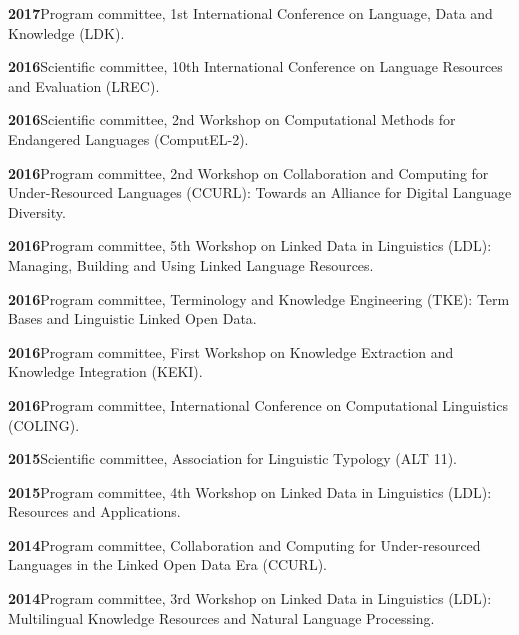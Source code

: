 \documentclass[11pt]{article}
\newcommand{\hangpara}{
 \setlength{\parindent}{0in} %
 \hangindent=0.42in %
}
\begin{document}
\vskip 6pt
\hangpara
{\bf 2017}\hspace{1ex}Program committee, 1st International Conference on Language, Data and Knowledge (LDK).

\vskip 6pt
\hangpara
{\bf 2016}\hspace{1ex}Scientific committee, 10th International Conference on Language Resources and Evaluation (LREC).

\vskip 6pt
\hangpara
{\bf 2016}\hspace{1ex}Scientific committee, 2nd Workshop on Computational Methods for Endangered Languages (ComputEL-2).

\vskip 6pt
\hangpara
{\bf 2016}\hspace{1ex}Program committee, 2nd Workshop on Collaboration and Computing for Under-Resourced Languages (CCURL): Towards an Alliance for Digital Language Diversity.

\vskip 6pt
\hangpara
{\bf 2016}\hspace{1ex}Program committee, 5th Workshop on Linked Data in Linguistics (LDL): Managing, Building and Using Linked Language Resources.

\vskip 6pt
\hangpara
{\bf 2016}\hspace{1ex}Program committee, Terminology and Knowledge Engineering (TKE): Term Bases and Linguistic Linked Open Data.

\vskip 6pt
\hangpara
{\bf 2016}\hspace{1ex}Program committee, First Workshop on Knowledge Extraction and Knowledge Integration (KEKI).

\vskip 6pt
\hangpara
{\bf 2016}\hspace{1ex}Program committee, International Conference on Computational Linguistics (COLING).

\vskip 6pt
\hangpara
{\bf 2015}\hspace{1ex}Scientific committee, Association for Linguistic Typology (ALT 11).

\vskip 6pt
\hangpara
{\bf 2015}\hspace{1ex}Program committee, 4th Workshop on Linked Data in Linguistics (LDL): Resources and Applications.

\vskip 6pt
\hangpara
{\bf 2014}\hspace{1ex}Program committee, Collaboration and Computing for Under-resourced Languages in the Linked Open Data Era (CCURL).

\vskip 6pt
\hangpara
{\bf 2014}\hspace{1ex}Program committee, 3rd Workshop on Linked Data in Linguistics (LDL): Multilingual Knowledge Resources and Natural Language Processing.
\end{document}
